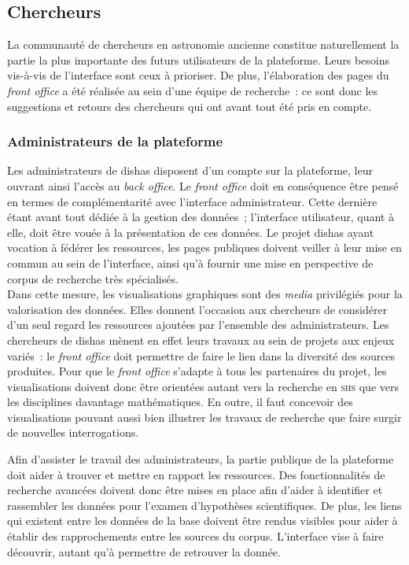 \documentclass[a4paper,12pt,twoside]{book}
\newcommand{\eng}{\emph}
\newcommand{\dishas}{\gls{dishas}\xspace}
\begin{document}
		\subsection{Chercheurs}
La communauté de chercheurs en astronomie ancienne constitue naturellement la partie la plus importante des futurs utilisateurs de la plateforme. Leurs besoins vis-à-vis de l'interface sont ceux à prioriser. De plus, l'élaboration des pages du \eng{front office} a été réalisée au sein d'une équipe de recherche~: ce sont donc les suggestions et retours des chercheurs qui ont avant tout été pris en compte.

			\subsubsection{Administrateurs de la plateforme}
Les administrateurs de \dishas disposent d'un compte sur la plateforme, leur ouvrant ainsi l'accès au \eng{back office}. Le \eng{front office} doit en conséquence être pensé en termes de complémentarité avec l'interface administrateur. Cette dernière étant avant tout dédiée à la gestion des données~; l'interface utilisateur, quant à elle, doit être vouée à la présentation de ces données. Le projet \dishas ayant vocation à fédérer les ressources, les pages publiques doivent veiller à leur mise en commun au sein de l'interface, ainsi qu'à fournir une mise en perspective de corpus de recherche très spécialisés.\\

Dans cette mesure, les visualisations graphiques sont des \emph{media} privilégiés pour la valorisation des données. Elles donnent l'occasion aux chercheurs de considérer d'un seul regard les ressources ajoutées par l'ensemble des administrateurs. Les chercheurs de \dishas mènent en effet leurs travaux au sein de projets aux enjeux variés~: le \eng{front office} doit permettre de faire le lien dans la diversité des sources produites. Pour que le \eng{front office} s'adapte à tous les partenaires du projet, les visualisations doivent donc être orientées autant vers la recherche en \textsc{shs} que vers les disciplines davantage mathématiques. En outre, il faut concevoir des visualisations pouvant aussi bien illustrer les travaux de recherche que faire surgir de nouvelles interrogations.

Afin d'assister le travail des administrateurs, la partie publique de la plateforme doit aider à trouver et mettre en rapport les ressources. Des fonctionnalités de recherche avancées doivent donc être mises en place afin d'aider à identifier et rassembler les données pour l'examen d'hypothèses scientifiques. De plus, les liens qui existent entre les données de la base doivent être rendus visibles pour aider à établir des rapprochements entre les sources du corpus. L'interface vise à faire découvrir, autant qu'à permettre de retrouver la donnée.
\end{document}
